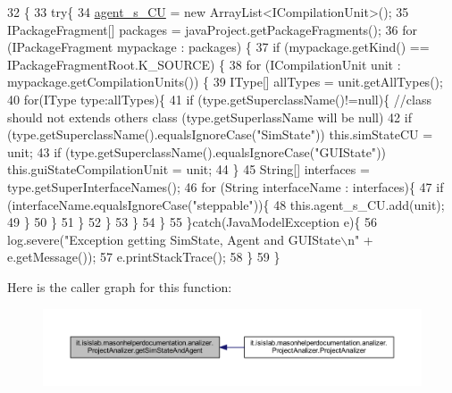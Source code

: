 \begin{DoxyCode}
32                                        \{
33         \textcolor{keywordflow}{try}\{
34             \hyperlink{classit_1_1isislab_1_1masonhelperdocumentation_1_1analizer_1_1_project_analizer_ad495cee63b37e3bf36c81ccf896f9ce2}{agent\_s\_CU} = \textcolor{keyword}{new} ArrayList<ICompilationUnit>();
35             IPackageFragment[] packages = javaProject.getPackageFragments();
36             \textcolor{keywordflow}{for} (IPackageFragment mypackage : packages) \{
37               \textcolor{keywordflow}{if} (mypackage.getKind() == IPackageFragmentRoot.K\_SOURCE) \{
38                   \textcolor{keywordflow}{for} (ICompilationUnit unit : mypackage.getCompilationUnits()) \{
39                       IType[] allTypes = unit.getAllTypes();
40                       \textcolor{keywordflow}{for}(IType type:allTypes)\{
41                           \textcolor{keywordflow}{if} (type.getSuperclassName()!=null)\{  \textcolor{comment}{//class should not extends others class
       (type.getSuperlassName will be null)}
42                               \textcolor{keywordflow}{if} (type.getSuperclassName().equalsIgnoreCase(\textcolor{stringliteral}{"SimState"}))    this.simStateCU
       = unit;
43                               \textcolor{keywordflow}{if} (type.getSuperclassName().equalsIgnoreCase(\textcolor{stringliteral}{"GUIState"}))    
      this.guiStateCompilationUnit = unit;
44                           \}
45                           String[] interfaces = type.getSuperInterfaceNames();
46                           \textcolor{keywordflow}{for} (String interfaceName : interfaces)\{
47                               \textcolor{keywordflow}{if} (interfaceName.equalsIgnoreCase(\textcolor{stringliteral}{"steppable"}))\{
48                                   this.agent\_s\_CU.add(unit);
49                               \}
50                           \}
51                       \}
52                 \}   
53               \}
54             \}
55         \}\textcolor{keywordflow}{catch}(JavaModelException e)\{
56             log.severe(\textcolor{stringliteral}{"Exception getting SimState, Agent and GUIState\(\backslash\)n"} + e.getMessage());
57             e.printStackTrace();
58         \}
59     \}
\end{DoxyCode}


Here is the caller graph for this function\-:
\nopagebreak
\begin{figure}[H]
\begin{center}
\leavevmode
\includegraphics[width=350pt]{classit_1_1isislab_1_1masonhelperdocumentation_1_1analizer_1_1_project_analizer_af2dfc3e88c4c1411d928017ed4957e1c_icgraph}
\end{center}
\end{figure}


